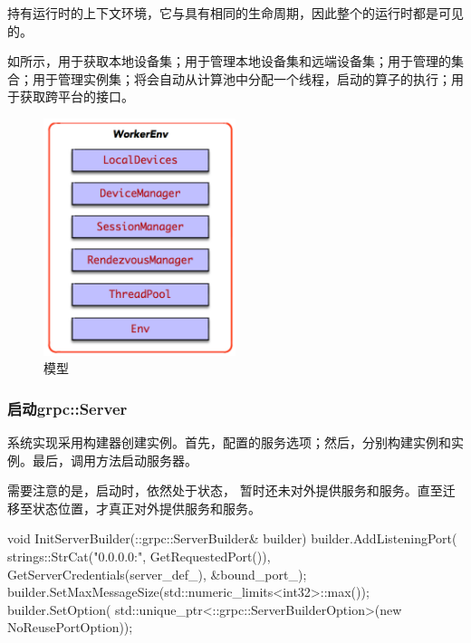 \begin{content}
持有运行时的上下文环境，它与具有相同的生命周期，因此整个的运行时都是可见的。

如所示，用于获取本地设备集；用于管理本地设备集和远端设备集；用于管理的集合；用于管理实例集；将会自动从计算池中分配一个线程，启动的算子的执行；用于获取跨平台的接口。

\begin{figure}[H]
\centering
\includegraphics[width=0.5\textwidth]{figures/dist-worker-env.png}
\caption{模型}
 \label{fig:dist-worker-env}
\end{figure}

\subsubsection{启动grpc::Server}

系统实现采用构建器创建实例。首先，配置的服务选项；然后，分别构建实例和实例。最后，调用方法启动服务器。

需要注意的是，启动时，依然处于状态，
暂时还未对外提供服务和服务。直至迁移至状态位置，才真正对外提供服务和服务。

\begin{leftbar}
\begin{c++}
void InitServerBuilder(::grpc::ServerBuilder& builder) {
  builder.AddListeningPort(
    strings::StrCat("0.0.0.0:", GetRequestedPort()),
    GetServerCredentials(server_def_), &bound_port_);
  builder.SetMaxMessageSize(std::numeric_limits<int32>::max());
  builder.SetOption(
      std::unique_ptr<::grpc::ServerBuilderOption>(new NoReusePortOption));
}


\end{c++}
\end{leftbar}
\end{content}
